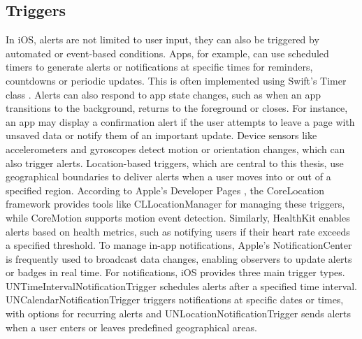 \subsection{Triggers}
In iOS, alerts are not limited to user input, they can also be triggered by automated or event-based conditions. 
Apps, for example, can use scheduled timers to generate alerts or notifications at specific times for reminders, countdowns or periodic updates. 
This is often implemented using Swift's Timer class \cite{apple_timer}.
Alerts can also respond to app state changes, such as when an app transitions to the background, returns to the foreground or closes. 
For instance, an app may display a confirmation alert if the user attempts to leave a page with unsaved data or notify them of an important update.
Device sensors like accelerometers and gyroscopes detect motion or orientation changes, which can also trigger alerts.
Location-based triggers, which are central to this thesis, use geographical boundaries to deliver alerts when a user moves into or out of a specified region.
According to Apple's Developer Pages \cite{apple_corelocation, apple_coremotion}, the CoreLocation framework provides tools like CLLocationManager for managing these triggers, while CoreMotion supports motion event detection. 
Similarly, HealthKit \cite{apple_healthkit} enables alerts based on health metrics, such as notifying users if their heart rate exceeds a specified threshold.
To manage in-app notifications, Apple's NotificationCenter \cite{apple_notificationcenter} is frequently used to broadcast data changes, enabling observers to update alerts or badges in real time. 
For notifications, iOS provides three main trigger types. 
UNTimeIntervalNotificationTrigger \cite{apple_time_trigger} schedules alerts after a specified time interval. 
UNCalendarNotificationTrigger \cite{apple_calender_trigger} triggers notifications at specific dates or times, with options for recurring alerts and UNLocationNotificationTrigger \cite{apple_location_trigger} sends alerts when a user enters or leaves predefined geographical areas.

